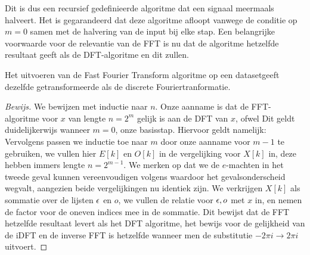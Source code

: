 Dit is dus een recursief gedefinieerde algoritme dat een signaal meermaals halveert.
Het is gegarandeerd dat deze algoritme afloopt vanwege de conditie op $m=0$ samen met de halvering van de input bij elke stap. 
Een belangrijke voorwaarde voor de relevantie van de FFT is nu dat de algoritme hetzelfde resultaat geeft als de DFT-algoritme en dit zullen.
\begin{stelling}
  Het uitvoeren van de Fast Fourier Transform algoritme op een datasetgeeft
  dezelfde getransformeerde als de discrete Fouriertranformatie.
\end{stelling}
\begin{proof}[Bewijs]
We bewijzen met inductie naar $n$. Onze aanname is dat de FFT-algoritme voor $x$ van lengte $n=2^m$ gelijk is aan de DFT van $x$, ofwel
Dit geldt duidelijkerwijs wanneer $m=0$, onze basisstap. Hiervoor geldt namelijk:
Vervolgens passen we inductie toe naar $m$ door onze aanname voor $m-1$ te gebruiken,
we vullen hier $E[k]$ en $O[k]$ in de vergelijking voor $X[k]$ in, deze hebben immers lengte $n=2^{m-1}$.
We merken op dat we de $e$-machten in het tweede geval kunnen vereenvoudigen volgens
waardoor het gevalsonderscheid wegvalt, aangezien beide vergelijkingen nu identiek zijn.
We verkrijgen $X[k]$ als sommatie over de lijsten $\epsilon$ en $o$, we vullen de relatie voor $\epsilon,o$ met $x$ in, en nemen de factor voor de oneven indices mee in de sommatie.
Dit bewijst dat de FFT hetzelfde resultaat levert als het DFT algoritme, het bewijs voor de gelijkheid van de iDFT en de inverse FFT is 
hetzelfde wanneer men de substitutie $-2\pi i \rightarrow 2\pi i$ uitvoert.
\end{proof}

